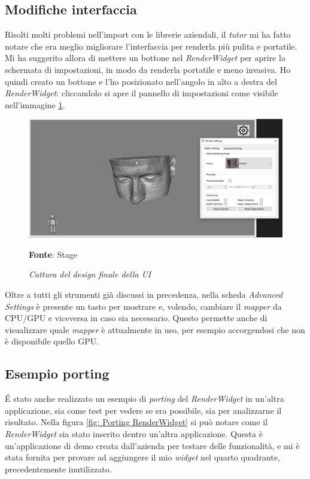 \subsection{Modifiche interfaccia}
Risolti molti problemi nell'import con le librerie aziendali, il \emph{tutor} mi ha fatto notare che era meglio migliorare l'interfaccia per renderla più pulita e portatile. Mi ha suggerito allora di mettere un bottone nel \emph{RenderWidget} per aprire la schermata di impostazioni, in modo da renderla portatile e meno invasiva. Ho quindi creato un bottone e l'ho posizionato nell'angolo in alto a destra del \emph{RenderWidget}: cliccandolo si apre il pannello di impostazioni come visibile nell'immagine \ref{fig: Final UI}.

\begin{figure}[h]
    \centering
    \includegraphics[width=1\textwidth]{immagini/svolgimento/finalnewui.png}
    \caption{\textit{Cattura del design finale della UI}}
    \textbf{Fonte}: Stage
    \label{fig: Final UI}
\end{figure}

Oltre a tutti gli strumenti già discussi in precedenza, nella scheda \emph{Advanced Settings} è presente un tasto per mostrare e, volendo, cambiare il \emph{mapper} da CPU/GPU e viceversa in caso sia necessario. Questo permette anche di visualizzare quale \emph{mapper} è attualmente in uso, per esempio accorgendosi che non è disponibile quello GPU.

\subsection{Esempio porting}
\'E stato anche realizzato un esempio di \emph{porting} del \emph{RenderWidget} in un'altra applicazione, sia come test per vedere se era possibile, sia per analizzarne il risultato. Nella figura \ref{fig: Porting RenderWidget} si può notare come il \emph{RenderWidget} sia stato inserito dentro un'altra applicazione. Questa è un'applicazione di demo creata dall'azienda per testare delle funzionalità, e mi è stata fornita per provare ad aggiungere il mio \emph{widget} nel quarto quadrante, precedentemente inutilizzato.

